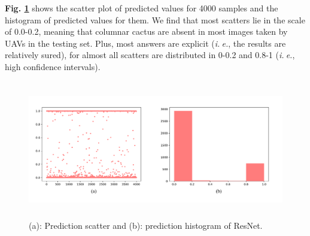 \documentclass[a4paper]{article}
\begin{document}
\large{

\textbf{Fig. \ref{resresults}} shows the scatter plot of predicted values for 4000 samples and the histogram of predicted values for them. We find that most scatters lie in the scale of 0.0-0.2, meaning that columnar cactus are absent in most images taken by UAVs in the testing set. Plus, most answers are explicit (\textit{i.$\ $e.}, the results are relatively sured), for almost all scatters are distributed in 0-0.2 and 0.8-1 (\textit{i.$\ $e.}, high confidence intervals).

}

\begin{figure}[h]
\centering
\includegraphics[width=15cm,height=6cm]{res_best.pdf}
\caption{ (a): Prediction scatter and (b): prediction histogram of \textsf{ResNet}.}
\label{resresults}
\end{figure}
\end{document}
